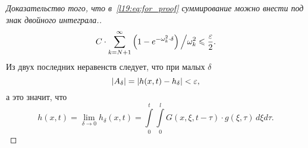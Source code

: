 \begin{proof}[Доказательство того, что в~\eqref{l19:eq:for_proof} суммирование можно внести под знак двойного интеграла.]
	\begin{equation*}
		C\cdot\sum\limits_{k=N+1}^{\infty}\left(1-e^{-\omega_k^2\cdot\delta}\right)\Big/\omega_k^2\leqslant\frac{\varepsilon}{2}.
	\end{equation*}
	Из двух последних неравенств следует, что при малых $\delta$
	\begin{equation*}
		|A_{\delta}|=|h(x,t)-h_{\delta}|<\varepsilon,
	\end{equation*}
	а это значит, что 
	\begin{equation*}
		h(x,t)=\lim\limits_{\delta\to0}h_{\delta}(x,t)=\int\limits_0^t\int\limits_0^l G(x,\xi,t-\tau)\cdot g(\xi,\tau)\,d\xi d\tau.
	\end{equation*} 
\end{proof}